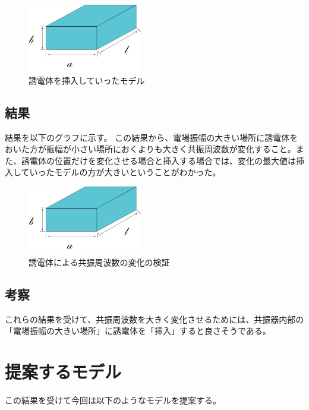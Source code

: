 \vspace{10 mm}

\begin{figure}[h]
  \begin{center}
    \includegraphics[width=5cm]{./image/空洞共振器.png}
    \caption{誘電体を挿入していったモデル}
    \label{fig:length}
  \end{center}
\end{figure}

\subsection{結果}
結果を以下のグラフに示す。
この結果から、電場振幅の大きい場所に誘電体をおいた方が振幅が小さい場所におくよりも大きく共振周波数が変化すること。また、誘電体の位置だけを変化させる場合と挿入する場合では、変化の最大値は挿入していったモデルの方が大きいということがわかった。


\vspace{10 mm}

\begin{figure}[h]
  \begin{center}
    \includegraphics[width=5cm]{./image/空洞共振器.png}
    \caption{誘電体による共振周波数の変化の検証}
    \label{fig:Cavity}
  \end{center}
\end{figure}


\subsection{考察}
これらの結果を受けて、共振周波数を大きく変化させるためには、共振器内部の「電場振幅の大きい場所」に誘電体を「挿入」すると良さそうである。

\section{提案するモデル}
この結果を受けて今回は以下のようなモデルを提案する。
